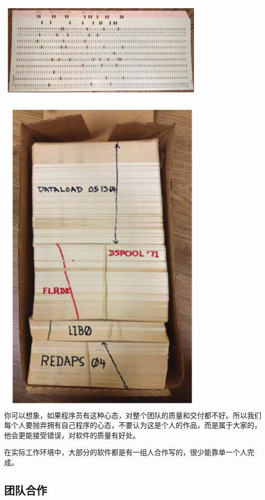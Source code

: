 \includegraphics[width=10cm]{cleanagile_f33.jpg}\\
\includegraphics[width=10cm]{cleanagile_f34.jpg}\\

你可以想象，如果程序员有这种心态，对整个团队的质量和交付都不好。所以我们每个人要抛弃拥有自己程序的心态，不要认为这是个人的作品，而是属于大家的，他会更能接受错误，对软件的质量有好处。

在实际工作环境中，大部分的软件都是有一组人合作写的，很少能靠单一个人完成。

\hypertarget{ux56e2ux961fux5408ux4f5c}{%
\subsection{团队合作}\label{ux56e2ux961fux5408ux4f5c}}

